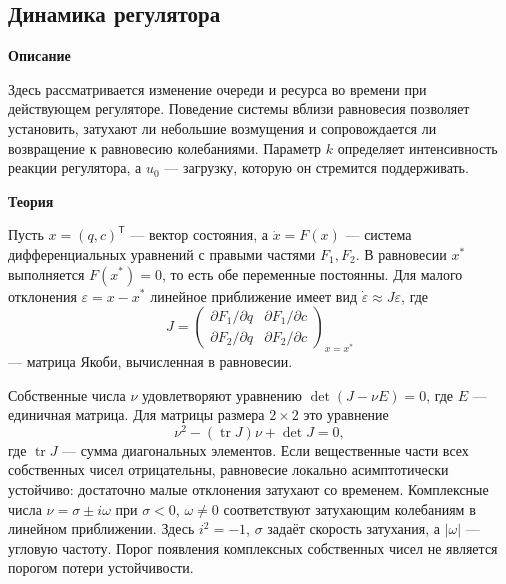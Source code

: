 \documentclass[12pt,a4paper]{article}
\newcommand{\taskhead}[1]{\par\textbf{#1}\par}
\begin{document}
\subsection{Динамика регулятора}
\taskhead{Описание}
Здесь рассматривается изменение очереди и ресурса во времени при действующем
регуляторе. Поведение системы вблизи равновесия позволяет установить,
затухают ли небольшие возмущения и сопровождается ли возвращение к равновесию
колебаниями. Параметр $k$ определяет интенсивность реакции регулятора,
а $u_0$ --- загрузку, которую он стремится поддерживать.
\taskhead{Теория}
Пусть $x=(q,c)^{\mathsf T}$ --- вектор состояния, а $\dot x=F(x)$ --- система
дифференциальных уравнений с правыми частями $F_1,F_2$.
В равновесии $x^*$ выполняется $F(x^*)=0$, то есть обе переменные постоянны.
Для малого отклонения $\varepsilon=x-x^*$ линейное приближение имеет вид
$\dot\varepsilon\approx J\varepsilon$, где
\[
J=\begin{pmatrix}
\partial F_1/\partial q&\partial F_1/\partial c\\
\partial F_2/\partial q&\partial F_2/\partial c
\end{pmatrix}_{x=x^*}
\]
--- матрица Якоби, вычисленная в равновесии.

Собственные числа $\nu$ удовлетворяют уравнению $\det(J-\nu E)=0$,
где $E$ --- единичная матрица. Для матрицы размера $2\times2$ это уравнение
\[
\nu^2-(\operatorname{tr}J)\nu+\det J=0,
\]
где $\operatorname{tr}J$ --- сумма диагональных элементов.
Если вещественные части всех собственных чисел отрицательны,
равновесие локально асимптотически устойчиво: достаточно малые отклонения
затухают со временем. Комплексные числа $\nu=\sigma\pm i\omega$
при $\sigma<0$, $\omega\ne0$ соответствуют затухающим колебаниям в линейном
приближении. Здесь $i^2=-1$, $\sigma$ задаёт скорость затухания,
а $|\omega|$ --- угловую частоту.
Порог появления комплексных собственных чисел не является порогом потери устойчивости.
\end{document}
